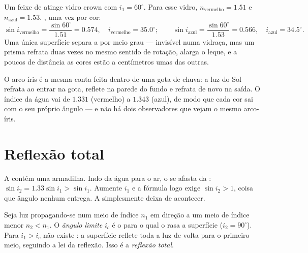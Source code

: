 \begin{example}\label{ex:g10:refraction:twocolors}
Um feixe de  atinge vidro crown com $i_1 = 60^\circ$. Para esse
vidro, $n_{\text{vermelho}} = 1.51$ e $n_{\text{azul}} = 1.53$. , uma vez por cor:
\[
\sin i_{\text{vermelho}} = \frac{\sin 60^\circ}{1.51} = 0.574,
\quad i_{\text{vermelho}} = 35.0^\circ ;
\qquad
\sin i_{\text{azul}} = \frac{\sin 60^\circ}{1.53} = 0.566,
\quad i_{\text{azul}} = 34.5^\circ .
\]
Uma única superfície separa a  por meio grau --- invisível numa
vidraça, mas um prisma refrata duas vezes no mesmo sentido de rotação,
alarga o leque, e a poucos  de distância as cores estão a
centímetros umas das outras.
\end{example}

\begin{remark}\label{rem:g10:refraction:rainbow}
O arco-íris é a mesma conta feita dentro de uma gota de chuva: a luz do
Sol refrata ao entrar na gota, reflete na parede do fundo e refrata de
novo na saída. O índice da água vai de $1.331$ (vermelho) a $1.343$
(azul), de modo que cada cor sai com o seu próprio ângulo --- e não há
dois observadores que vejam o mesmo arco-íris.
\end{remark}

\section{Reflexão total}

A  contém uma armadilha. Indo da água para o ar, o  se afasta da : $\sin i_2 = 1.33 \sin i_1 > \sin i_1$.
Aumente $i_1$ e a fórmula logo exige $\sin i_2 > 1$, coisa que ângulo
nenhum entrega. A  simplesmente deixa de acontecer.

\begin{definition}\label{def:g10:refraction:critical}
Seja luz propagando-se num meio de índice $n_1$ em direção a um meio de
índice menor $n_2 < n_1$. O \emph{ângulo limite}
$i_c$ é o  para o qual o  rasa a
superfície ($i_2 = 90^\circ$). Para $i_1 > i_c$ não existe : a superfície reflete toda a luz de volta para o primeiro meio,
seguindo a lei da reflexão. Isso é a \emph{reflexão total}.
\end{definition}

